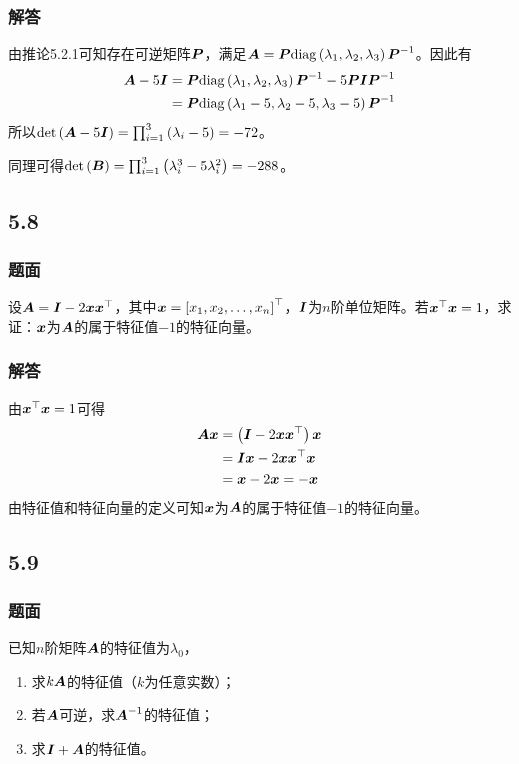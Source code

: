\documentclass[9pt,xcolor=svgnames]{beamer} %
\begin{document}
\begin{frame}
    \frametitle{解答}

    由推论5.2.1可知存在可逆矩阵\(\boldsymbol{P}\)，满足\(\boldsymbol{A}=\boldsymbol{P}\mathrm{diag}\left( \lambda_1,\lambda_2,\lambda_3 \right){\boldsymbol{P}}^{-1}\)。因此有
    \begin{align*}
        \boldsymbol{A}-5\boldsymbol{I} & =\boldsymbol{P}\mathrm{diag}\left( \lambda_1,\lambda_2,\lambda_3 \right){\boldsymbol{P}}^{-1}-5\boldsymbol{P}\boldsymbol{I}{\boldsymbol{P}}^{-1} \\
                     & =\boldsymbol{P}\mathrm{diag}\left( \lambda_1-5,\lambda_2-5,\lambda_3-5 \right){\boldsymbol{P}}^{-1}
    \end{align*}
    \pause
    所以\(\mathrm{det}\left( \boldsymbol{A}-5\boldsymbol{I} \right)=\prod_{i=1}^3\left( \lambda_i-5 \right)=-72\)。

    同理可得\(\mathrm{det}\left( \boldsymbol{B} \right)=\prod_{i=1}^3\left( \lambda_i^3-5\lambda_i^2 \right)=-288\)。

\end{frame}

\subsection*{5.8}
\begin{frame}
    \frametitle{题面}
    设\(\boldsymbol{A}=\boldsymbol{I}-2\boldsymbol{x}\boldsymbol{x}^\top\)，其中\(\boldsymbol{x}=\left[ {x}_1,{x}_2,\dots,{x}_{n} \right]^\top\)，\(\boldsymbol{I}\)为\(n\)阶单位矩阵。若\(\boldsymbol{x}^\top\boldsymbol{x}=1\)，求证：\(\boldsymbol{x}\)为\(\boldsymbol{A}\)的属于特征值\(-1\)的特征向量。
\end{frame}

\begin{frame}
    \frametitle{解答}
    由\(\boldsymbol{x}^\top\boldsymbol{x}=1\)可得
    \begin{align*}
        \boldsymbol{A}\boldsymbol{x} & =\left( \boldsymbol{I}-2\boldsymbol{x}\boldsymbol{x}^\top \right)\boldsymbol{x} \\
                   & =\boldsymbol{I}\boldsymbol{x}-2\boldsymbol{x}\boldsymbol{x}^\top\boldsymbol{x}   \\
                   & =\boldsymbol{x}-2\boldsymbol{x}=-\boldsymbol{x}
    \end{align*}
    \pause
    由特征值和特征向量的定义可知\(\boldsymbol{x}\)为\(\boldsymbol{A}\)的属于特征值\(-1\)的特征向量。
\end{frame}

\subsection*{5.9}
\begin{frame}
    \frametitle{题面}
    已知\(n\)阶矩阵\(\boldsymbol{A}\)的特征值为\(\lambda_0\)，
    \begin{enumerate}
        \item 求\(k\boldsymbol{A}\)的特征值（\(k\)为任意实数）；
        \item 若\(\boldsymbol{A}\)可逆，求\({\boldsymbol{A}}^{-1}\)的特征值；
        \item 求\(\boldsymbol{I}+\boldsymbol{A}\)的特征值。
    \end{enumerate}
\end{frame}
\end{document}
